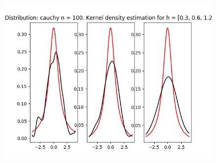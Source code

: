 \documentclass[12pt]{article}
\begin{document}
\begin{center}
\begin{figure}[H]
\includegraphics[width=\textwidth]{kernel/d_cauchy100.png}
\end{figure}


\end{center}
\end{document}
